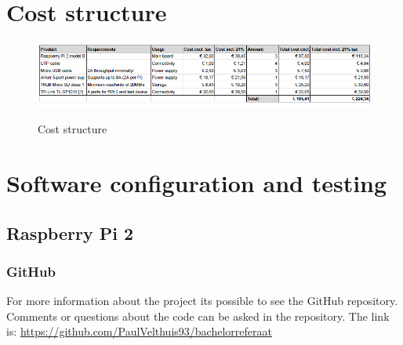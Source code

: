 \documentclass{sig-alternate-br}
\begin{document}
\section{Cost structure}\label{sec:cost}
\begin{figure}[H]
	\includegraphics[scale=0.8]{cost_cluster.png}
	\label{fig:cost}
	\caption{Cost structure}
\end{figure}


\section{Software configuration and testing}\label{sec:software}

\subsection{Raspberry Pi 2}

\subsubsection{GitHub}
For more information about the project its possible to see the GitHub repository. Comments or questions about the code can be asked in the repository. \newline
The link is: \newline
\url{https://github.com/PaulVelthuis93/bachelorreferaat}
\end{document}
